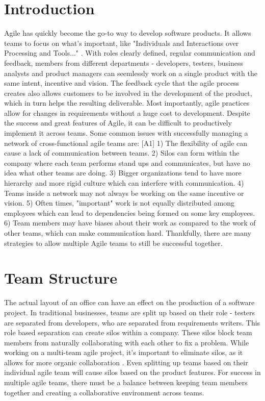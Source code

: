 \documentclass[sigplan,screen]{acmart}
\begin{document}
\section{Introduction}
Agile has quickly become the go-to way to develop software products.
It allows teams to focus on what's important, like "Individuals and Interactions over Processing and Tools..." \cite{b3}. 
With roles clearly defined, regular communication and feedback, members from different departments - developers, testers, business analysts and product managers can seemlessly work on a single product with the same intent, incentive and vision.
The feedback cycle that the agile process creates also allows customers to be involved in the development of the product, which in turn helps the resulting deliverable.
Most importantly, agile practices allow for changes in requirements without a huge cost to development.
Despite the success and great features of Agile, it can be difficult to productively implement it across teams.
Some common issues with successfully managing a network of cross-functional agile teams are: [A1]
1) The flexibility of agile can cause a lack of communication between teams. 2) Silos can form within the company where each team performs stand ups and communicates, but have no idea what other teams are doing.
3) Bigger organizations tend to have more hierarchy and more rigid culture which can interfere with communication. 4) Teams inside a network may not always be working on the same incentive or vision. 5) Often times, "important" work is not equally distributed among employees which can lead to dependencies being formed on some key employees.
6) Team members may have biases about their work as compared to the work of other teams, which can make communication hard.
Thankfully, there are many strategies to allow multiple Agile teams to still be successful together.

\section{Team Structure}
The actual layout of an office can have an effect on the production of a software project.
In traditional businesses, teams are split up based on their role - testers are separated from developers, who are separated from requirements writers.
This role based separation can create silos within a company. 
These silos block team members from naturally collaborating with each other to fix a problem.
While working on a multi-team agile project, it's important to eliminate silos, as it allows for more organic collaboration \cite{b1}.
Even splitting up teams based on their individual agile team will cause silos based on the product features.
For success in multiple agile teams, there must be a balance between keeping team members together and creating a collaborative environment across teams.
\end{document}
